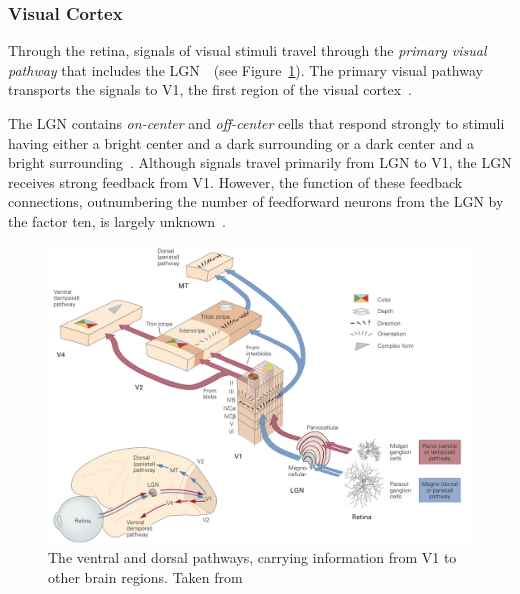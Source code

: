 \subsubsection{Visual Cortex}\label{subsubsec:visual-cortex}


Through the retina, signals of visual stimuli travel through the \textit{primary visual pathway} that includes the \ac{LGN}~\citep[p. 559]{mack2013principles}~(see Figure~\ref{fig:ventral_dorsal_pathway}).
The primary visual pathway transports the signals to \acf{V1}, the first region of the visual cortex~\citep[p. 559]{mack2013principles}.

The \ac{LGN} contains \textit{on-center} and \textit{off-center} cells that respond strongly to stimuli having either a bright center and a dark surrounding or a dark center and a bright surrounding~\citep[pp. 564-566]{mack2013principles}.
Although signals travel primarily from \ac{LGN} to \ac{V1}, the \ac{LGN} receives strong feedback from \ac{V1}.
However, the function of these feedback connections, outnumbering the number of feedforward neurons from the \ac{LGN} by the factor ten, is largely unknown~\citep[p. 573]{mack2013principles}.

\begin{figure}
    \centering
    \includegraphics[width=.8\textwidth]{images/ventral_dorsal.jpeg}
    \caption[Ventral and dorsal pathways]{The ventral and dorsal pathways, carrying information from \ac{V1} to other brain regions. Taken from \citet[p. 571]{mack2013principles}}
    \label{fig:ventral_dorsal_pathway}
\end{figure}

